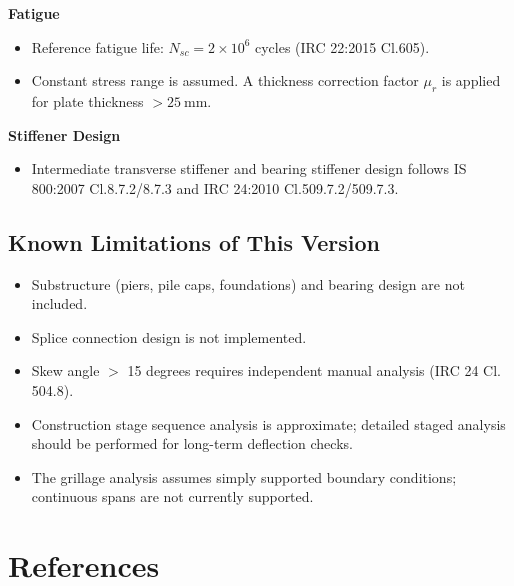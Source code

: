 \documentclass[12pt,a4paper]{report}
\numberwithin{figure}{chapter}
\begin{document}
\textbf{Fatigue}

\begin{itemize}
\item Reference fatigue life: $N_{sc} = 2 \times 10^6$ cycles (IRC 22:2015 Cl.605).
\item Constant stress range is assumed. A thickness correction factor $\mu_r$ is applied for plate thickness $> 25 \ \text{mm}$.
\end{itemize}

\textbf{Stiffener Design}

\begin{itemize}
\item Intermediate transverse stiffener and bearing stiffener design follows IS 800:2007 Cl.8.7.2/8.7.3 and IRC 24:2010 Cl.509.7.2/509.7.3.
\end{itemize}


\section{Known Limitations of This Version}
\label{sec:limitations}

\begin{itemize}
\item Substructure (piers, pile caps, foundations) and bearing design are not included.
\item Splice connection design is not implemented.
\item Skew angle $>$ 15 degrees requires independent manual analysis (IRC 24 Cl. 504.8).
\item Construction stage sequence analysis is approximate; detailed staged analysis
  should be performed for long-term deflection checks.
\item The grillage analysis assumes simply supported boundary conditions;
  continuous spans are not currently supported.
\end{itemize}


\chapter*{References}
\end{document}
